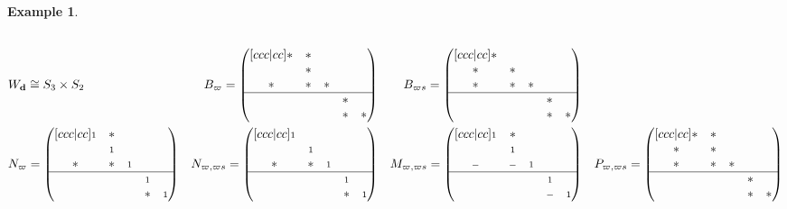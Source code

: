 \documentclass[reqno,11pt]{book}
\numberwithin{equation}{section}
\theoremstyle{plain}
\newtheorem{eg}[theorem]{Example}
\theoremstyle{plain}
\numberwithin{equation}{section}
\theoremstyle{remark}
\newcommand{\dimvec}[1]{\mathbf{#1}}
\newcommand{\ww}{\varpi}
\begin{document}
\begin{eg}
\begin{equation*}
\begin{aligned}
  \\
&W_{\dimvec{d}}\cong S_3 \times S_2&
  B_{\ww}=
   \begin{pmatrix}[ccc|cc]
  * & * &  &  &  \\
   & * &  &  &  \\
  * & * & * &  &  \\
     \hline
   &  &  & * &  \\
   &  &  & * & * \\
  \end{pmatrix}&&
  B_{\ww s}=
     \begin{pmatrix}[ccc|cc]
  * &  &  &  &  \\
  * & * &  &  &  \\
  * & * & * &  &  \\
     \hline
   &  &  & * &  \\
   &  &  & * & * \\
    \end{pmatrix}&&
  \\
   &N_{\ww}=
    \begin{pmatrix}[ccc|cc]
   \scriptstyle 1 & * &  &  &  \\
    & \scriptstyle 1 &  &  &  \\
   * & * & \scriptstyle 1 &  &  \\
      \hline
    &  &  & \scriptstyle 1 &  \\
    &  &  & * & \scriptstyle 1 \\
   \end{pmatrix}&
   N_{\ww,\ww s}=
      \begin{pmatrix}[ccc|cc]
   \scriptstyle 1 &  &  &  &  \\
    & \scriptstyle 1 &  &  &  \\
   * & * & \scriptstyle 1 &  &  \\
      \hline
    &  &  & \scriptstyle 1 &  \\
    &  &  & * & \scriptstyle 1 \\
     \end{pmatrix}&& 
   M_{\ww,\ww s}=
      \begin{pmatrix}[ccc|cc]
   \scriptstyle 1 & * &  &  &  \\
    & \scriptstyle 1 &  &  &  \\
   \scriptstyle- & \scriptstyle- & \scriptstyle 1 &  &  \\
      \hline
    &  &  & \scriptstyle 1 &  \\
    &  &  & \scriptstyle- & \scriptstyle 1 \\
     \end{pmatrix}&& 
   P_{\ww,\ww s}=
      \begin{pmatrix}[ccc|cc]
   * & * &  &  &  \\
   * & * &  &  &  \\
   * & * & * &  &  \\
   \hline
    &  &  & * &  \\
    &  &  & * & * \\
     \end{pmatrix}
\end{aligned}
\end{equation*}




\end{eg}
\end{document}
